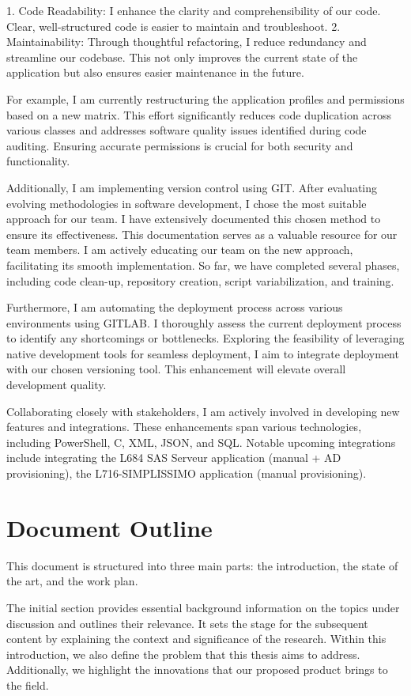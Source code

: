 1. Code Readability: I enhance the clarity and comprehensibility of our code. Clear, well-structured code is easier to maintain and troubleshoot.
2. Maintainability: Through thoughtful refactoring, I reduce redundancy and streamline our codebase. This not only improves the current state of the application but also ensures easier maintenance in the future.

For example, I am currently restructuring the application profiles and permissions based on a new matrix. This effort significantly reduces code duplication across various classes and addresses software quality issues identified during code auditing. Ensuring accurate permissions is crucial for both security and functionality.

Additionally, I am implementing version control using GIT. After evaluating evolving methodologies in software development, I chose the most suitable approach for our team. I have extensively documented this chosen method to ensure its effectiveness. This documentation serves as a valuable resource for our team members. I am actively educating our team on the new approach, facilitating its smooth implementation. So far, we have completed several phases, including code clean-up, repository creation, script variabilization, and training.

Furthermore, I am automating the deployment process across various environments using GITLAB. I thoroughly assess the current deployment process to identify any shortcomings or bottlenecks. Exploring the feasibility of leveraging native development tools for seamless deployment, I aim to integrate deployment with our chosen versioning tool. This enhancement will elevate overall development quality.

Collaborating closely with stakeholders, I am actively involved in developing new features and integrations. These enhancements span various technologies, including PowerShell, C, XML, JSON, and SQL. Notable upcoming integrations include integrating the L684 SAS Serveur application (manual + AD provisioning), the L716-SIMPLISSIMO application (manual provisioning).


\section{Document Outline}

This document is structured into three main parts: the introduction, the state of the art, and the work plan.

The initial section provides essential background information on the topics under discussion and outlines their relevance. It sets the stage for the subsequent content by explaining the context and significance of the research. Within this introduction, we also define the problem that this thesis aims to address. Additionally, we highlight the innovations that our proposed product brings to the field.

